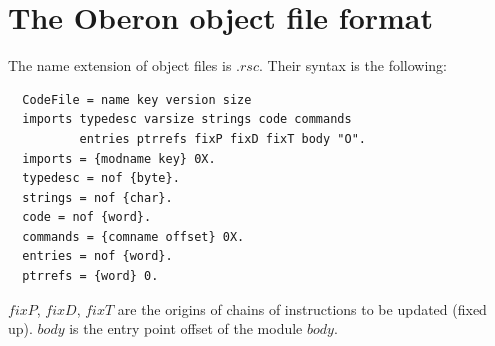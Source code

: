 \section{The Oberon object file format}
The name extension of object files is $.rsc$. Their syntax is the following:
\begin{verbatim}
  CodeFile = name key version size
  imports typedesc varsize strings code commands
          entries ptrrefs fixP fixD fixT body "O".
  imports = {modname key} 0X.
  typedesc = nof {byte}.
  strings = nof {char}.
  code = nof {word}.
  commands = {comname offset} 0X.
  entries = nof {word}.
  ptrrefs = {word} 0.
\end{verbatim}
$fixP$, $fixD$, $fixT$ are the origins of chains of instructions to be updated (fixed up). $body$ is the entry point
offset of the module $body$.